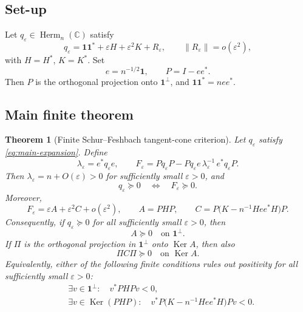 \documentclass[11pt]{article}
\newtheorem{theorem}{Theorem}[section]
\newcommand{\one}{\mathbf 1}
\newcommand{\C}{\mathbb C}
\newcommand{\eps}{\varepsilon}
\newcommand{\Ker}{\operatorname{Ker}}
\newcommand{\norm}[1]{\lVert #1\rVert}
\newcommand{\Herm}{\operatorname{Herm}}
\begin{document}
\subsection{Set-up}

Let \(q_\eps\in\Herm_n(\C)\) satisfy
\begin{equation}
  q_\eps=\one\one^*+\eps H+\eps^2K+R_\eps,
  \qquad \norm{R_\eps}=o(\eps^2),
  \label{eq:main-expansion}
\end{equation}
with \(H=H^*\), \(K=K^*\).  Set
\begin{equation}
  e=n^{-1/2}\one,
  \qquad P=I-ee^*.
  \label{eq:e-P}
\end{equation}
Then \(P\) is the orthogonal projection onto \(\one^\perp\), and \(\one\one^*=nee^*\).

\subsection{Main finite theorem}

\begin{theorem}[Finite Schur--Feshbach tangent-cone criterion]
\label{thm:finite-certificate}
Let \(q_\eps\) satisfy \eqref{eq:main-expansion}.  Define
\begin{equation}
  \lambda_\eps=e^*q_\eps e,
  \qquad
  F_\eps=Pq_\eps P-Pq_\eps e\,\lambda_\eps^{-1}\,e^*q_\eps P.
  \label{eq:F-eps}
\end{equation}
Then \(\lambda_\eps=n+O(\eps)>0\) for sufficiently small \(\eps>0\), and
\begin{equation}
  q_\eps\succeq0
  \quad\Longleftrightarrow\quad
  F_\eps\succeq0.
  \label{eq:schur-equivalence}
\end{equation}
Moreover,
\begin{equation}
  F_\eps=
  \eps A+\eps^2C+o(\eps^2),
  \qquad
  A=PHP,
  \qquad
  C=P\bigl(K-n^{-1}Hee^*H\bigr)P.
  \label{eq:A-C}
\end{equation}
Consequently, if \(q_\eps\succeq0\) for all sufficiently small \(\eps>0\), then
\begin{equation}
  A\succeq0\quad\text{on }\one^\perp.
  \label{eq:first-condition}
\end{equation}
If \(\Pi\) is the orthogonal projection in \(\one^\perp\) onto \(\Ker A\), then also
\begin{equation}
  \Pi C\Pi\succeq0\quad\text{on }\Ker A.
  \label{eq:second-condition}
\end{equation}
Equivalently, either of the following finite conditions rules out positivity for all sufficiently small \(\eps>0\):
\begin{align}
  &\exists v\in\one^\perp:
    \quad v^*PHPv<0,
    \label{eq:first-negative-direction}\\
  &\exists v\in\Ker(PHP):
    \quad v^*P\bigl(K-n^{-1}Hee^*H\bigr)Pv<0.
    \label{eq:second-negative-direction}
\end{align}
\end{theorem}
\end{document}

